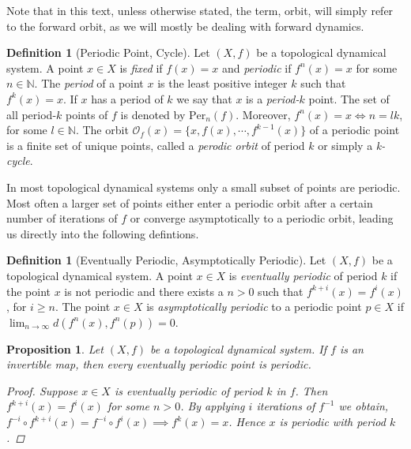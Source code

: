 \documentclass[11pt,a4paper,oneside]{memoir}
\theoremstyle{plain}
\newtheorem{prop}[thm]{Proposition}
\theoremstyle{definition}
\newtheorem{defn}[thm]{Definition}
\begin{document}
Note that in this text, unless otherwise stated, the term, orbit, will simply refer to the forward orbit, as we will mostly be dealing with forward dynamics.

\begin{defn}[Periodic Point, Cycle] \label{defn:periodic-point}
    Let $(X, f)$ be a topological dynamical system. A point $x \in X$ is \emph{fixed} if $f(x) = x$ and \emph{periodic} if $f^n(x) = x$ for some $n \in \mathbb{N}$. The \emph{period} of a point $x$ is the least positive integer $k$ such that $f^k(x) = x$. If $x$ has a period of $k$ we say that $x$ is a \emph{period-$k$} point. The set of all period-$k$ points of $f$ is denoted by $\text{Per}_n(f)$. Moreover, $f^n(x) = x \iff n = lk$, for some $l \in \mathbb{N}$. The orbit $\mathcal{O}_f(x) = \lbrace x, f(x), \cdots, f^{k-1}(x) \rbrace$ of a periodic point is a finite set of unique points, called a \emph{perodic orbit} of period $k$ or simply a \emph{k-cycle}.
\end{defn}

In most topological dynamical systems only a small subset of points are periodic. Most often a larger set of points either enter a periodic orbit after a certain number of iterations of $f$ or converge asymptotically to a periodic orbit, leading us directly into the following defintions.

\begin{defn}[Eventually Periodic, Asymptotically Periodic] \label{defn:eventually-asymptotically-periodic}
    Let $(X, f)$ be a topological dynamical system. A point $x \in X$ is \emph{eventually periodic} of period $k$ if the point $x$ is not periodic and there exists a $n > 0$ such that $f^{k+i}(x) = f^i(x)$, for $i \geq n$. The point $x \in X$ is \emph{asymptotically periodic} to a periodic point $p \in X$ if $\lim_{n \to \infty} d(f^n(x), f^n(p)) = 0$.
\end{defn}

\begin{prop} \label{prop:eventually-periodic-implies-periodic}
    Let $(X, f)$ be a topological dynamical system. If $f$ is an invertible map, then every eventually periodic point is periodic.
    \begin{proof}
        Suppose $x \in X$ is eventually periodic of period $k$ in $f$. Then $f^{k + i}(x) = f^i(x)$ for some $n > 0$. By applying $i$ iterations of $f^{-1}$ we obtain, $f^{-i} \circ f^{k + i}(x) = f^{-i} \circ f^{i}(x) \implies f^k(x) = x$. Hence $x$ is periodic with period $k$.
    \end{proof}
\end{prop}
\end{document}
